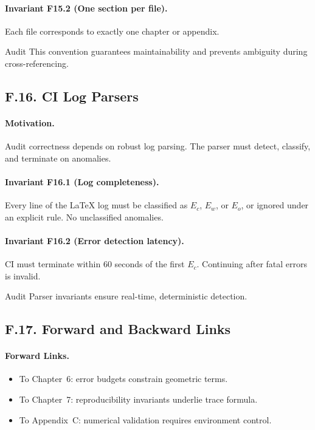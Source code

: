 \paragraph{Invariant F15.2 (One section per file).}
Each file corresponds to exactly one chapter or appendix.

\begin{auditblock}{Audit}
This convention guarantees maintainability and prevents ambiguity during
cross-referencing.
\end{auditblock}

\subsection*{F.16. CI Log Parsers}

\paragraph{Motivation.}
Audit correctness depends on robust log parsing. The parser must detect,
classify, and terminate on anomalies.

\paragraph{Invariant F16.1 (Log completeness).}
Every line of the LaTeX log must be classified as $E_c$, $E_w$, or
$E_o$, or ignored under an explicit rule. No unclassified anomalies.

\paragraph{Invariant F16.2 (Error detection latency).}
CI must terminate within 60 seconds of the first $E_c$. Continuing after
fatal errors is invalid.

\begin{auditblock}{Audit}
Parser invariants ensure real-time, deterministic detection.
\end{auditblock}

\subsection*{F.17. Forward and Backward Links}

\paragraph{Forward Links.}
\begin{itemize}
  \item To Chapter~6: error budgets constrain geometric terms.
  \item To Chapter~7: reproducibility invariants underlie trace formula.
  \item To Appendix~C: numerical validation requires environment control.
\end{itemize}

